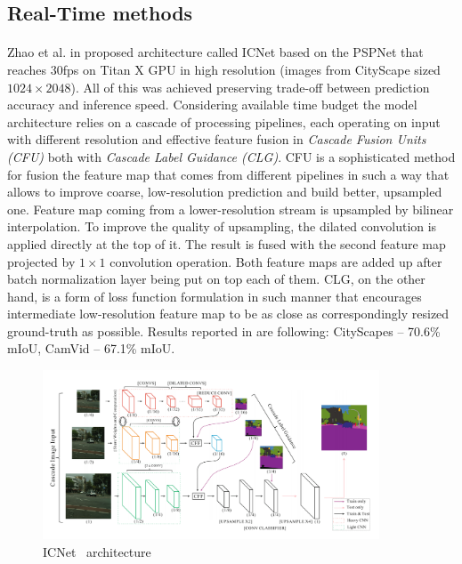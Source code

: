 \documentclass{article}
\begin{document}
\subsection{Real-Time methods}
\label{sec:rt_methods}
\paragraph{}
Zhao et al. in \cite{icnet} proposed architecture called ICNet based on the PSPNet \cite{psp} that reaches 30fps on Titan X GPU in high resolution (images from CityScape \cite{cityscapes} sized $1024 \times 2048$). All of this was achieved preserving trade-off between prediction accuracy and inference speed. Considering available time budget the model architecture relies on a cascade of processing pipelines, each operating on input with different resolution and effective feature fusion in \textit{Cascade Fusion Units (CFU)} both with \textit{Cascade Label Guidance (CLG)}. CFU is a sophisticated method for fusion the feature map that comes from different pipelines in such a way that allows to improve coarse, low-resolution prediction and build better, upsampled one. Feature map coming from a lower-resolution stream is upsampled by bilinear interpolation. To improve the quality of upsampling, the dilated convolution is applied directly at the top of it. The result is fused with the second feature map projected by $1 \times 1$ convolution operation. Both feature maps are added up after batch normalization layer being put on top each of them. CLG, on the other hand, is a form of loss function formulation in such manner that encourages intermediate low-resolution feature map to be as close as correspondingly resized ground-truth as possible. Results reported in \cite{icnet} are following: CityScapes \cite{cityscapes} -- 70.6\% mIoU, CamVid \cite{camvid} -- 67.1\% mIoU.
\begin{figure}[!htb]
    \centering
  \includegraphics[width=10cm, keepaspectratio]{images/i-cnet-architecture.png}
  \caption{ICNet~\cite{icnet} architecture}
  \label{fig:i-cnet-architecture}
\end{figure}
\end{document}
